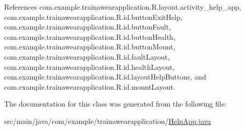 References com.\+example.\+trainawearapplication.\+R.\+layout.\+activity\+\_\+help\+\_\+app, com.\+example.\+trainawearapplication.\+R.\+id.\+button\+Exit\+Help, com.\+example.\+trainawearapplication.\+R.\+id.\+button\+Fault, com.\+example.\+trainawearapplication.\+R.\+id.\+button\+Health, com.\+example.\+trainawearapplication.\+R.\+id.\+button\+Mount, com.\+example.\+trainawearapplication.\+R.\+id.\+fault\+Layout, com.\+example.\+trainawearapplication.\+R.\+id.\+health\+Layout, com.\+example.\+trainawearapplication.\+R.\+id.\+layout\+Help\+Buttons, and com.\+example.\+trainawearapplication.\+R.\+id.\+mount\+Layout.



The documentation for this class was generated from the following file\+:\begin{DoxyCompactItemize}
\item 
src/main/java/com/example/trainawearapplication/\mbox{\hyperlink{_help_app_8java}{Help\+App.\+java}}\end{DoxyCompactItemize}
